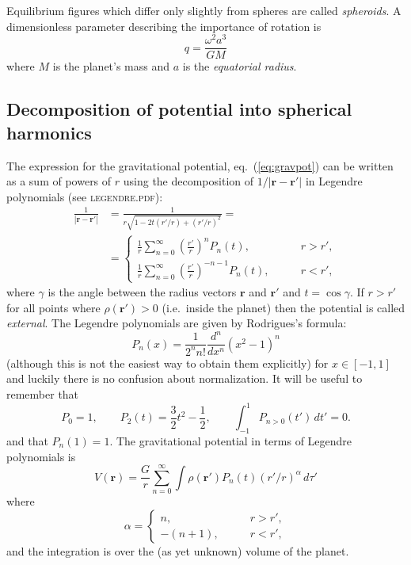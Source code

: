 \documentclass[amsmath,amsfonts,rmp,letterpaper]{revtex4}
\newcommand{\V}[1]{\mathbf{#1}} %
\newcommand{\abs}[1]{\left\vert#1\right\vert} %
\newcommand{\arr}{\V{r}}
\newcommand{\arp}{\V{r'}}
\begin{document}
Equilibrium figures which differ only slightly from spheres are called \emph
{spheroids}. A dimensionless parameter describing the importance of rotation is
\begin{equation}\label{eq:smallq}
q = \frac{\omega^2a^3}{GM}
\end{equation}
where $M$ is the planet's mass and $a$ is the \emph{equatorial radius}.

\subsection{Decomposition of potential into spherical harmonics}
\label{sec:spherical_harmonics}
The expression for the gravitational potential, eq.~(\ref{eq:gravpot}) can be
written as a sum of powers of $r$ using the decomposition of $1/\abs{\arr-\arp}$
in Legendre polynomials (see \textsc{legendre.pdf}):
\begin{equation}\label{eq:lege_exp}
\begin{split}
\frac{1}{\abs{\arr-\arp}} &= \frac{1}{r\sqrt{1 - 2t(r'/r) + (r'/r)^2}} = \\
&=
\begin{cases}
\frac{1}{r}\sum_{n=0}^{\infty}(\frac{r'}{r})^nP_n(t),&\qquad r>r',\\
\frac{1}{r}\sum_{n=0}^{\infty}(\frac{r'}{r})^{-n-1}P_n(t),&\qquad r<r',
\end{cases}
\end{split}
\end{equation}
where $\gamma$ is the angle between the radius vectors $\arr$ and $\arp$ and
$t=\cos\gamma$. If $r>r'$ for all points where $\rho(\arp)>0$ (i.e.~inside the
planet) then the potential is called \emph{external}. The Legendre polynomials are
given by Rodrigues's formula:
\begin{equation}\label{eq:rodrigues}
P_n(x) = \frac{1}{2^nn!}\frac{d^n}{dx^n}(x^2 - 1)^n
\end{equation}
(although this is not the easiest way to obtain them explicitly) for
$x\in{[-1,1]}$ and luckily there is no confusion about normalization. It will be
useful to remember that
\begin{equation*}
P_0 = 1, \qquad P_2(t) = \frac{3}{2}t^2 - \frac{1}{2},
\qquad\int_{-1}^{1}P_{n>0}(t')\,dt' = 0.
\end{equation*}
and that $P_n(1)=1$.
The gravitational potential in terms of Legendre polynomials is
\begin{equation}\label{eq:lege_gravity}
V(\arr) = \frac{G}{r}\sum_{n=0}^\infty\int\rho(\arp)P_n(t)(r'/r)^\alpha\,d\tau'
\end{equation}
where
\begin{equation*}
\alpha=
\begin{cases}
n,&\qquad r>r',\\
-(n+1),&\qquad r<r',
\end{cases}
\end{equation*}
and the integration is over the (as yet unknown) volume of the planet.
\end{document}
